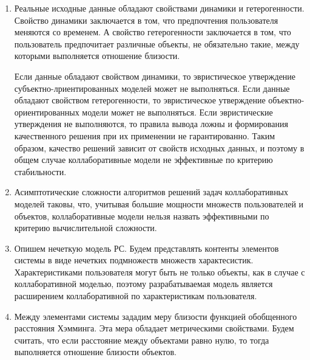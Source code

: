 \documentclass[a4paper,11pt]{proc}
\begin{document}
{\begin{enumerate}
		Достаточным условием, при выполнении которого
		субъектно-ориентированные модели гарантированно формируют
		качественное решение задачи прогнозирования является выполнение
		транзитивности отношения близости пользователей на кластере соседей.

		Выполнение достаточных условий зависит от того,
		какие функции были выбраны в качестве мер близости
		и какие их пороговые значения установлены разработчиками или
		исследователями РС. Стоит отметить, что не всегда при разработке
		реальной РС возможно подобрать эти параметры модели так,
		чтобы выполнялись достаточные условия и РС удовлетворяла
		требованиям заказчика.

	\item Реальные исходные данные обладают свойствами динамики и
		гетерогенности. Свойство динамики заключается в том, что предпочтения
		пользователя меняются со временем. А свойство гетерогенности
		заключается в том, что пользователь предпочитает различные объекты, не
		обязательно такие, между которыми выполняется отношение близости.

		Если данные обладают свойством динамики, то эвристическое утверждение
		субъектно-лриентированных моделей может не выполняться.
		Если данные обладают свойством гетерогенности, то эвристическое утверждение
		объектно-ориентированных модели может не выполняться.
		Если эвристические утверждения не выполняются, то правила вывода
		ложны и формирования качественного решения при их применении не
		гарантированно. Таким образом, качество решений зависит от свойств
		исходных данных,  и поэтому в общем случае коллаборативные модели не
		эффективные по критерию стабильности.

	\item Асимптотические сложности алгоритмов решений задач
		коллаборативных моделей таковы, что, учитывая большие
		мощности множеств пользователей и объектов, коллаборативные
		модели нельзя назвать эффективными по критерию вычислительной
		сложности.

	\item Опишем нечеткую модель РС.
		Будем представлять контенты элементов системы в виде нечетких
		подмножеств множеств характесистик.
		Характеристиками пользователя могут быть не
		только объекты, как в случае с коллаборативной моделью,
		поэтому разрабатываемая модель является расширением
		коллаборативной по характеристикам пользователя.

	\item Между элементами системы зададим меру близости функцией
		обобщенного расстояния Хэмминга. Эта мера обладает
		метрическими свойствами. Будем считать, что если расстояние между
		объектами равно нулю, то тогда выполняется отношение близости объектов.


\end{enumerate}}
\end{document}
